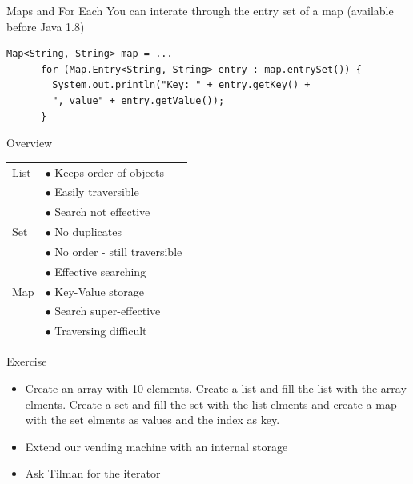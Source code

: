 \begin{frame}[fragile]{Maps and For Each}
  You can interate through the entry set of a map (available before Java 1.8)
	\begin{lstlisting}[basicstyle=\ttfamily\scriptsize]
      Map<String, String> map = ...
      for (Map.Entry<String, String> entry : map.entrySet()) {
        System.out.println("Key: " + entry.getKey() +
        ", value" + entry.getValue());
      }
	\end{lstlisting}
\end{frame}

\begin{frame}{Overview}
	\begin{center}
		\begin{tabular}{ l | l }
			List & $ \bullet $ Keeps order of objects \\
				 & $ \bullet $ Easily traversible \\
				 & $ \bullet $ Search not effective \\
			\hline
			Set  & $ \bullet $ No duplicates \\
				 & $ \bullet $ No order - still traversible \\
				 & $ \bullet $ Effective searching \\
			\hline
			Map  & $ \bullet $ Key-Value storage \\
				 & $ \bullet $ Search super-effective \\
				 & $ \bullet $ Traversing difficult
			
		\end{tabular}
	\end{center}
\end{frame}

\begin{frame}{Exercise}
	\begin{itemize}
		\item Create an array with 10 elements. Create a list and fill the list with the array 		elments. Create a set and fill the set with the list elments and create a map with the set elments as values and the index as key.
		\item Extend our vending machine with an internal storage
		\item Ask Tilman for the iterator
	\end{itemize}
\end{frame}

